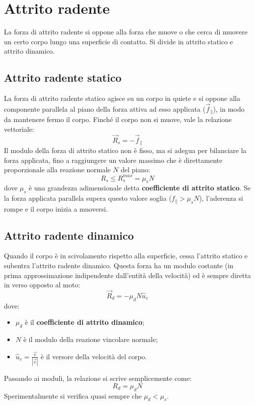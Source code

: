 \documentclass[11pt, a4paper, openright]{book}
\theoremstyle{plain}
\theoremstyle{definition}
\begin{document}
\newpage

\section{Attrito radente}
La forza di attrito radente si oppone alla forza che muove o che cerca di muovere un certo corpo lungo una superficie di contatto. Si divide in attrito statico e attrito dinamico.

\subsection{Attrito radente statico}
La forza di attrito radente statico agisce su un corpo in quiete e si oppone alla componente parallela al piano della forza attiva ad esso applicata ($\vec{f}_{\parallel}$), in modo da mantenere fermo il corpo. Finché il corpo non si muove, vale la relazione vettoriale:
\[\vec{R}_s = -\vec{f}_{\parallel}\]
Il modulo della forza di attrito statico non è fisso, ma si adegua per bilanciare la forza applicata, fino a raggiungere un valore massimo che è direttamente proporzionale alla reazione normale $N$ del piano:
\[R_s \leq R_s^{max} = \mu_s N\]
dove $\mu_s$ è una grandezza adimensionale detta \textbf{coefficiente di attrito statico}. Se la forza applicata parallela supera questo valore soglia ($f_{\parallel} > \mu_s N$), l'aderenza si rompe e il corpo inizia a muoversi.

\subsection{Attrito radente dinamico}
Quando il corpo è in scivolamento rispetto alla superficie, cessa l'attrito statico e subentra l'attrito radente dinamico. Questa forza ha un modulo costante (in prima approssimazione indipendente dall'entità della velocità) ed è sempre diretta in verso opposto al moto:
\[\vec{R}_d = -\mu_d N \hat{u}_v\]
dove:
\begin{itemize}
    \item $\mu_d$ è il \textbf{coefficiente di attrito dinamico};
    \item $N$ è il modulo della reazione vincolare normale;
    \item $\hat{u}_v = \frac{\vec{v}}{|\vec{v}|}$ è il versore della velocità del corpo.
\end{itemize}
Passando ai moduli, la relazione si scrive semplicemente come:
\[R_d = \mu_d N\]
Sperimentalmente si verifica quasi sempre che $\mu_d < \mu_s$. 
\end{document}
